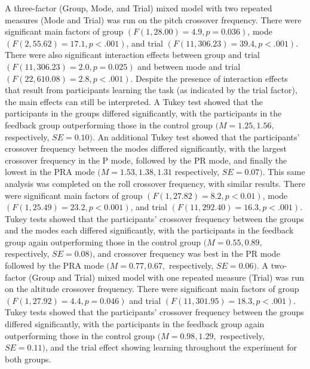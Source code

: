 A three-factor (Group, Mode, and Trial) mixed model with two repeated measures (Mode and Trial) was run on the pitch crossover frequency.
There were significant main factors of group $(F(1, 28.00) = 4.9, p = 0.036)$, mode $(F(2, 55.62) = 17.1, p < .001)$, and trial $(F(11, 306.23) = 39.4, p < .001)$.
There were also significant interaction effects between group and trial $(F(11, 306.23) = 2.0, p = 0.025)$ and between mode and trial $(F(22, 610.08) = 2.8, p < .001)$.
Despite the presence of interaction effects that result from participants learning the task (as indicated by the trial factor), the main effects can still be interpreted.
A Tukey test showed that the participants in the groups differed significantly, with the participants in the feedback group outperforming those in the control group $(M = 1.25, 1.56,$ respectively, $SE = 0.10)$.
An additional Tukey test showed that the participants' crossover frequency between the modes differed significantly, with the largest crossover frequency in the P mode, followed by the PR mode, and finally the lowest in the PRA mode $(M = 1.53, 1.38, 1.31$ respectively, $SE = 0.07)$.
This same analysis was completed on the roll crossover frequency, with similar results.
There were significant main factors of group $(F(1, 27.82) = 8.2, p < 0.01)$, mode $(F(1, 25.49) = 23.2, p < 0.001)$, and trial $(F(11, 292.40) = 16.3, p < .001)$.
Tukey tests showed that the participants' crossover frequency between the groups and the modes each differed significantly, with the participants in the feedback group again outperforming those in the control group $(M = 0.55, 0.89,$ respectively, $SE = 0.08)$, and crossover frequency was best in the PR mode followed by the PRA mode $(M = 0.77, 0.67,$ respectively, $SE = 0.06)$.
A two-factor (Group and Trial) mixed model with one repeated measure (Trial) was run on the altitude crossover frequency.
There were significant main factors of group $(F(1, 27.92) = 4.4, p = 0.046)$ and trial $(F(11, 301.95) = 18.3, p < .001)$.
Tukey tests showed that the participants' crossover frequency between the groups differed significantly, with the participants in the feedback group again outperforming those in the control group $(M = 0.98, 1.29,$ respectively, $SE = 0.11)$, and the trial effect showing learning throughout the experiment for both groups.


